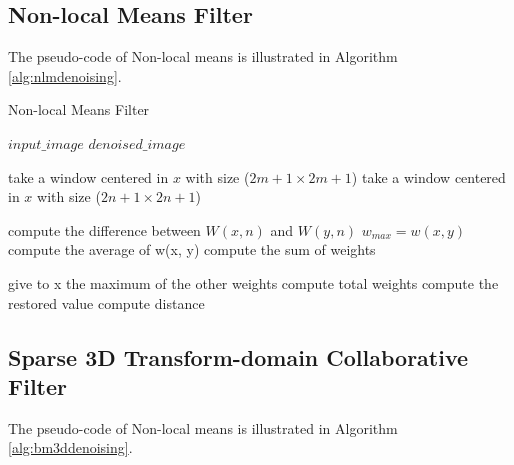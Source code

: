 \subsection{Non-local Means Filter}

The pseudo-code of Non-local means is illustrated in Algorithm \ref{alg:nlmdenoising}.

\begin{algorithm}[h]
	\caption{Non-local Means Filter}\label{alg:nlmdenoising}
	\begin{algorithmic}[1]
		\Require $input\_image$
		\Ensure $denoised\_image$
		
			\State take a window centered in $x$ with size ($2m+1 \times 2m+1$)
			\State take a window centered in $x$ with size ($2n+1 \times 2n+1$)

		
				\State compute the difference between $W(x,n)$ and $W( y,n)$
					\State $w_{max} = w(x, y)$
				\EndIf
				\State compute the average of w(x, y)
				\State compute the sum of weights
			\EndFor
		
			\State give to x the maximum of the other weights
			\State compute total weights
			\State compute the restored value
			\State compute distance
		\EndFor
				
		\EndProcedure
	\end{algorithmic}
\end{algorithm}

\subsection{Sparse 3D Transform-domain Collaborative Filter}

The pseudo-code of Non-local means is illustrated in Algorithm \ref{alg:bm3ddenoising}.

